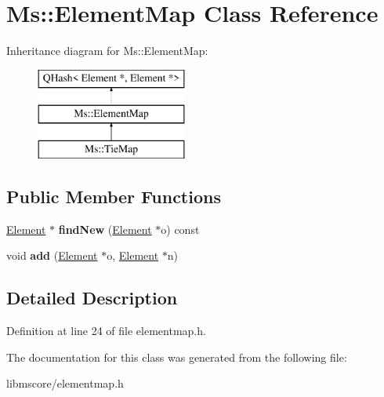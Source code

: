 \hypertarget{class_ms_1_1_element_map}{}\section{Ms\+:\+:Element\+Map Class Reference}
\label{class_ms_1_1_element_map}
Inheritance diagram for Ms\+:\+:Element\+Map\+:\begin{figure}[H]
\begin{center}
\leavevmode
\includegraphics[height=3.000000cm]{class_ms_1_1_element_map}
\end{center}
\end{figure}
\subsection*{Public Member Functions}
\begin{DoxyCompactItemize}
\item 
\mbox{\label{class_ms_1_1_element_map_ac2fff238ae040ec94e7682b88072b12f}} 
\hyperlink{class_ms_1_1_element}{Element} $\ast$ {\bfseries find\+New} (\hyperlink{class_ms_1_1_element}{Element} $\ast$o) const
\item 
\mbox{\label{class_ms_1_1_element_map_a96a6e33cacf115b28754f8b24aefc786}} 
void {\bfseries add} (\hyperlink{class_ms_1_1_element}{Element} $\ast$o, \hyperlink{class_ms_1_1_element}{Element} $\ast$n)
\end{DoxyCompactItemize}


\subsection{Detailed Description}


Definition at line 24 of file elementmap.\+h.



The documentation for this class was generated from the following file\+:\begin{DoxyCompactItemize}
\item 
libmscore/elementmap.\+h\end{DoxyCompactItemize}
